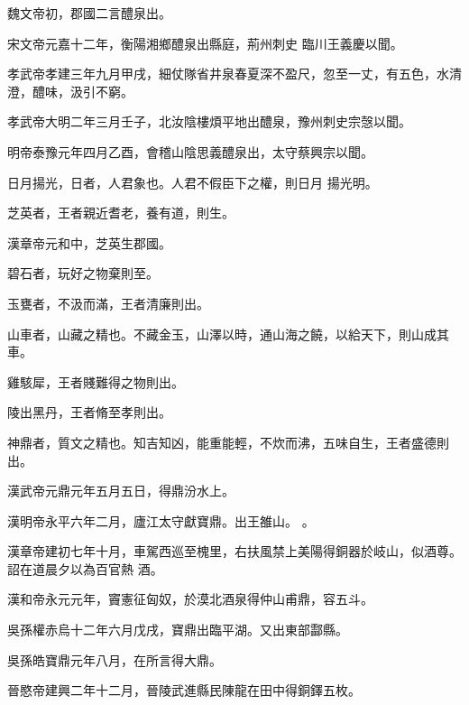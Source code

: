 \begin{pinyinscope}
 魏文帝初，郡國二言醴泉出。



 宋文帝元嘉十二年，衡陽湘鄉醴泉出縣庭，荊州刺史
 臨川王義慶以聞。



 孝武帝孝建三年九月甲戌，細仗隊省井泉春夏深不盈尺，忽至一丈，有五色，水清澄，醴味，汲引不窮。



 孝武帝大明二年三月壬子，北汝陰樓煩平地出醴泉，豫州刺史宗愨以聞。



 明帝泰豫元年四月乙酉，會稽山陰思義醴泉出，太守蔡興宗以聞。


日月揚光，日者，人君象也。人君不假臣下之權，則日月
 揚光明。



 芝英者，王者親近耆老，養有道，則生。



 漢章帝元和中，芝英生郡國。


碧石者，玩好之物棄則至。


玉甕者，不汲而滿，王者清廉則出。


山車者，山藏之精也。不藏金玉，山澤以時，通山海之饒，以給天下，則山成其車。


雞駭犀，王者賤難得之物則出。


陵出黑丹，王者脩至孝則出。



 神鼎者，質文之精也。知吉知凶，能重能輕，不炊而沸，五味自生，王者盛德則出。



 漢武帝元鼎元年五月五日，得鼎汾水上。


漢明帝永平六年二月，廬江太守獻寶鼎。出王雒山。
 。



 漢章帝建初七年十月，車駕西巡至槐里，右扶風禁上美陽得銅器於岐山，似酒尊。詔在道晨夕以為百官熱
 酒。



 漢和帝永元元年，竇憲征匈奴，於漠北酒泉得仲山甫鼎，容五斗。



 吳孫權赤烏十二年六月戊戌，寶鼎出臨平湖。又出東部酃縣。



 吳孫皓寶鼎元年八月，在所言得大鼎。



 晉愍帝建興二年十二月，晉陵武進縣民陳龍在田中得銅鐸五枚。




\end{pinyinscope}
